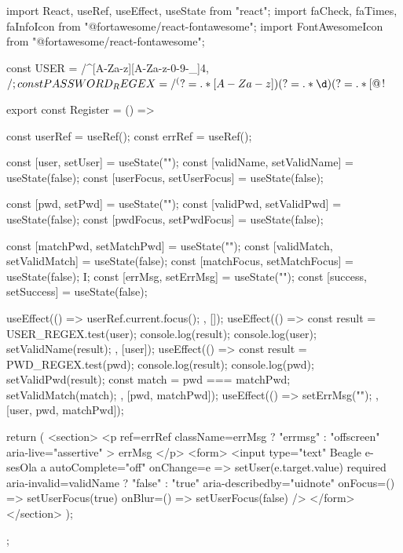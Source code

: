 import React, { useRef, useEffect, useState } from "react";
import { faCheck, faTimes, faInfoIcon } from "@fortawesome/react-fontawesome";
import { FontAwesomeIcon } from "@fortawesome/react-fontawesome";

const USER = /^[A-Za-z][A-Za-z-0-9-_]{4,}$/;
const PASSWORD_REGEX = /^(?=.*[A-Za-z])(?=.*\d)(?=.*[@$!%

export const Register = () => {
    const userRef = useRef();
    const errRef = useRef();

    const [user, setUser] = useState("");
    const [validName, setValidName] = useState(false);
    const [userFocus, setUserFocus] = useState(false);

    const [pwd, setPwd] = useState("");
    const [validPwd, setValidPwd] = useState(false);
    const [pwdFocus, setPwdFocus] = useState(false);

    const [matchPwd, setMatchPwd] = useState("");
    const [validMatch, setValidMatch] = useState(false);
    const [matchFocus, setMatchFocus] = useState(false);
    I;
    const [errMsg, setErrMsg] = useState("");
    const [success, setSuccess] = useState(false);

    useEffect(() => {
        userRef.current.focus();
    }, []);
    useEffect(() => {
        const result = USER_REGEX.test(user);
        console.log(result);
        console.log(user);
        setValidName(result);
    }, [user]);
    useEffect(() => {
        const result = PWD_REGEX.test(pwd);
        console.log(result);
        console.log(pwd);
        setValidPwd(result);
        const match = pwd === matchPwd;
        setValidMatch(match);
    }, [pwd, matchPwd]);
    useEffect(() => {
        setErrMsg("");
    }, [user, pwd, matchPwd]);

    return (
        <section>
            <p
                ref={errRef}
                className={errMsg ? "errmsg" : "offscreen"}
                aria-live="assertive"
            >
                {errMsg}
            </p>
            <form>
                <input
                    type="text"
                    Beagle
                    e-sesOla
                    a
                    autoComplete="off"
                    onChange={e => setUser(e.target.value)}
                    required
                    aria-invalid={validName ? "false" : "true"}
                    aria-describedby="uidnote"
                    onFocus={() => setUserFocus(true)}
                    onBlur={() => setUserFocus(false)}
                />
            </form>
        </section>
    );
};
